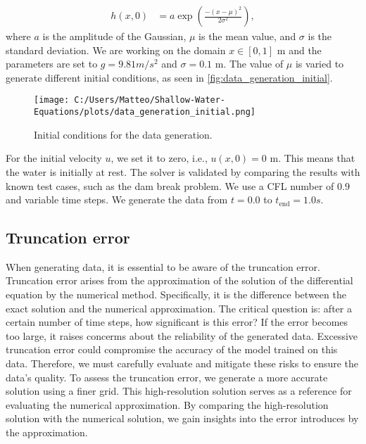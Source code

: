 \begin{align}\label{eq:1D_swe_ic_gaussian}
    h(x,0) &= a \exp{\left(\frac{-{(x-\mu)}^2}{2\sigma^2}\right)},
\end{align}
where $a$ is the amplitude of the Gaussian, $\mu$ is the mean value, and $\sigma$ is the standard deviation.
We are working on the domain $x \in [0,1]$ m and the parameters are set to $g = 9.81 m/s^2$ and $\sigma = 0.1$ m.
The value of $\mu$ is varied to generate different initial conditions, as seen in \autoref{fig:data_generation_initial}.
\begin{figure}[H]
    \centering
    \texttt{[image: C:/Users/Matteo/Shallow-Water-Equations/plots/data\_generation\_initial.png]}
    \caption{Initial conditions for the data generation.}\label{fig:data_generation_initial}
\end{figure}
For the initial velocity $u$, we set it to zero, i.e., $u(x,0) = 0$ m. This means that the water is initially at rest.
The solver is validated by comparing the results with known test cases, such as the dam break problem.
We use a CFL number of $0.9$ and variable time steps.
We generate the data from $t = 0.0$ to $t_{\text{end}} = 1.0 s$.

\subsection*{Truncation error}
When generating data, it is essential to be aware of the truncation error.
Truncation error arises from the approximation of the solution of the differential equation by the numerical method.
Specifically, it is the difference between the exact solution and the numerical approximation.
The critical question is: after a certain number of time steps, how significant is this error?
If the error becomes too large, it raises concerms about the reliability of the generated data.
Excessive truncation error could compromise the accuracy of the model trained on this data.
Therefore, we must carefully evaluate and mitigate these risks to ensure the data's quality.
To assess the truncation error, we generate a more accurate solution using a finer grid.
This high-resolution solution serves as a reference for evaluating the numerical approximation.
By comparing the high-resolution solution with the numerical solution, we gain insights into the error introduces by the approximation.

